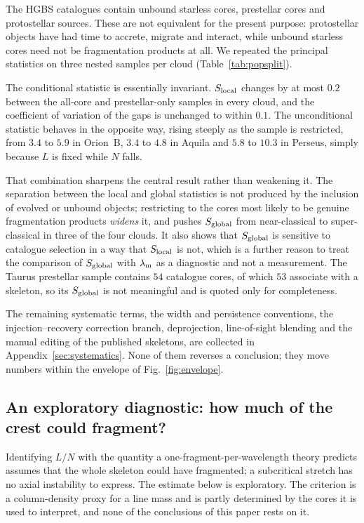 \documentclass[usenatbib,twoside,twocolumn]{mnras}
\begin{document}
The HGBS catalogues contain unbound starless cores, prestellar cores and protostellar sources. These are not equivalent for the present purpose: protostellar objects have had time to accrete, migrate and interact, while unbound starless cores need not be fragmentation products at all. We repeated the principal statistics on three nested samples per cloud (Table~\ref{tab:popsplit}).

The conditional statistic is essentially invariant. $S_{\rm local}$ changes by at most $0.2$ between the all-core and prestellar-only samples in every cloud, and the coefficient of variation of the gaps is unchanged to within $0.1$. The unconditional statistic behaves in the opposite way, rising steeply as the sample is restricted, from $3.4$ to $5.9$ in Orion~B, $3.4$ to $4.8$ in Aquila and $5.8$ to $10.3$ in Perseus, simply because $L$ is fixed while $N$ falls.

That combination sharpens the central result rather than weakening it. The separation between the local and global statistics is not produced by the inclusion of evolved or unbound objects; restricting to the cores most likely to be genuine fragmentation products \emph{widens} it, and pushes $S_{\rm global}$ from near-classical to super-classical in three of the four clouds. It also shows that $S_{\rm global}$ is sensitive to catalogue selection in a way that $S_{\rm local}$ is not, which is a further reason to treat the comparison of $S_{\rm global}$ with $\lambda_{\rm m}$ as a diagnostic and not a measurement. The Taurus prestellar sample contains $54$ catalogue cores, of which $53$ associate with a skeleton, so its $S_{\rm global}$ is not meaningful and is quoted only for completeness.




The remaining systematic terms, the width and persistence conventions, the injection--recovery correction branch, deprojection, line-of-sight blending and the manual editing of the published skeletons, are collected in Appendix~\ref{sec:systematics}. None of them reverses a conclusion; they move numbers within the envelope of Fig.~\ref{fig:envelope}.

\subsection{An exploratory diagnostic: how much of the crest could fragment?}
\label{sec:eligible}


Identifying $L/N$ with the quantity a one-fragment-per-wavelength theory predicts assumes that the whole skeleton could have fragmented; a subcritical stretch has no axial instability to express. The estimate below is exploratory. The criterion is a column-density proxy for a line mass and is partly determined by the cores it is used to interpret, and none of the conclusions of this paper rests on it.
\end{document}
